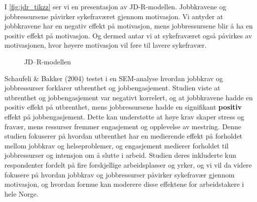 \documentclass[
  12pt,
  a4paper,
  DIV=11,
  numbers=noendperiod]{scrartcl}
\begin{document}
I \autoref{fig:jdr_tikzz} ser vi en presentasjon av JD-R-modellen.
Jobbkravene og jobbressursene påvirker sykefraværet gjennom motivasjon.
Vi antyder at jobbkravene har en negativ effekt på motivasjon, mens
jobbressursene blir å ha en positiv effekt på motivasjon. Og dermed
antar vi at sykefraværet også påvirkes av motivasjonen, hvor høyere
motivasjon vil føre til lavere sykefravær.

\begin{figure}
  \centering
  \caption{JD–R-modellen}
  \label{fig:jdr_tikzz}
\end{figure}

Schaufeli \& Bakker (2004) testet i en SEM-analyse hvordan jobbkrav og
jobbressurser forklarer utbrenthet og jobbengasjement. Studien viste at
utbrenthet og jobbengasjement var negativt korrelert, og at jobbkravene
hadde en positiv effekt på utbrenthet, mens jobbressursene hadde en
signifikant \textbf{positiv} effekt på jobbengasjement. Dette kan
understøtte at høye krav skaper stress og fravær, mens ressurser fremmer
engasjement og opplevelse av mestring. Denne studien fokuserer på
hvordan utbrenthet har en medierende effekt på forholdet mellom jobbkrav
og helseproblemer, og engasjement medierer forholdet til jobbressurser
og intensjon om å slutte i arbeid. Studien deres inkluderte kun
respondenter fordelt på fire forskjellige arbeidsplasser og yrker, og vi
vil da videre fokusere på hvordan jobbkrav og jobbressurser påvirker
sykefravær gjennom motivasjon, og hvordan formue kan moderere disse
effektene for arbeidstakere i hele Norge.
\end{document}
